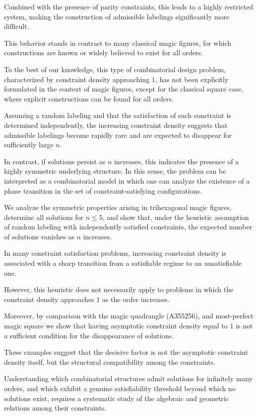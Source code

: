 \documentclass[11pt]{article}
\theoremstyle{plain}
\theoremstyle{definition}
\begin{document}
Combined with the presence of parity constraints, this leads to a highly 
restricted system, making the construction of admissible labelings 
significantly more difficult. 

This behavior stands in contrast to many classical magic figures, 
for which constructions are known or widely believed to exist for all orders.


To the best of our knowledge, this type of combinatorial design problem, 
characterized by constraint density approaching $1$, has not been 
explicitly formulated in the context of magic figures, except for the classical square case, where explicit constructions can be found for all orders.

Assuming a random labeling and that the satisfaction of each constraint 
is determined independently, the increasing constraint density suggests 
that admissible labelings become rapidly rare and are expected to disappear 
for sufficiently large $n$. 

In contrast, if solutions persist as $n$ increases, this indicates the presence 
of a highly symmetric underlying structure. In this sense, the problem can be 
interpreted as a combinatorial model in which one can analyze the existence 
of a phase transition in the set of constraint-satisfying configurations.


We analyze the symmetric properties arising in trihexagonal magic figures, 
determine all solutions for $n \le 5$, and show that, under the heuristic 
assumption of random labeling with independently satisfied constraints, 
the expected number of solutions vanishes as $n$ increases.

In many constraint satisfaction problems, increasing constraint density 
is associated with a sharp transition from a satisfiable regime to an 
unsatisfiable one.


However, this heuristic does not necessarily apply to problems in which 
the constraint density approaches $1$ as the order increases.


Moreover, by comparison with the magic quadrangle (A355256),\cite{OEISA355256} 
and most-perfect magic square\cite{OllerenshawBree1998}
we show that having asymptotic constraint density equal to $1$ is not a sufficient 
condition for the disappearance of solutions. 

These examples suggest that the decisive factor is not the asymptotic 
constraint density itself, but the structural compatibility among the 
constraints.

Understanding which combinatorial structures admit solutions for 
infinitely many orders, and which exhibit a genuine satisfiability 
threshold beyond which no solutions exist, requires a systematic study 
of the algebraic and geometric relations among their constraints.
\end{document}
